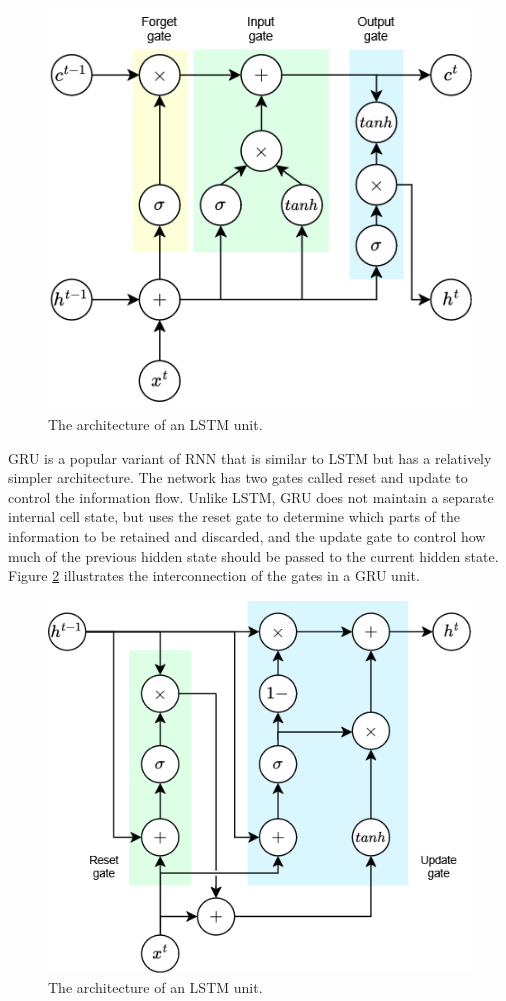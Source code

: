 \documentclass[preprint,12pt]{elsarticle}
\begin{document}
\begin{figure}[h!]
    \centering
    \includegraphics[scale=0.5]{fig_deep_sv_learning_lstm.png}
    \caption{The architecture of an LSTM unit.}
    \label{fig_deep_sv_learning_lstm}
\end{figure}

GRU is a popular variant of RNN that is similar to LSTM but has a relatively simpler architecture. The network has two gates called reset and update to control the information flow. Unlike LSTM, GRU does not maintain a separate internal cell state, but uses the reset gate to determine which parts of the information to be retained and discarded, and the update gate to control how much of the previous hidden state should be passed to the current hidden state. Figure \ref{fig_deep_sv_learning_gru} illustrates the interconnection of the gates in a GRU unit.

\begin{figure}[h!]
    \centering
    \includegraphics[scale=0.5]{fig_deep_sv_learning_gru.png}
    \caption{The architecture of an LSTM unit.}
    \label{fig_deep_sv_learning_gru}
\end{figure}
\end{document}
